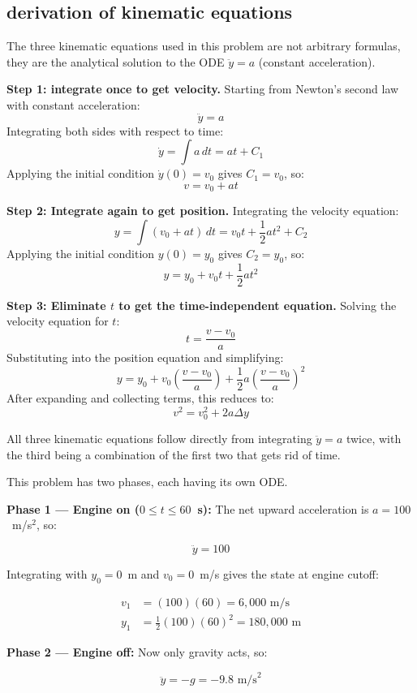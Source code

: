 \documentclass[12pt]{article}
\begin{document}
\subsection{derivation of kinematic equations}

The three kinematic equations used in this problem are not arbitrary formulas,
they are the analytical solution to the ODE $\ddot{y} = a$ (constant acceleration).

\textbf{Step 1: integrate once to get velocity.}
Starting from Newton's second law with constant acceleration:
\[
    \ddot{y} = a
\]
Integrating both sides with respect to time:
\[
    \dot{y} = \int a \, dt = at + C_1
\]
Applying the initial condition $\dot{y}(0) = v_0$ gives $C_1 = v_0$, so:
\[
    v = v_0 + at
\]

\textbf{Step 2: Integrate again to get position.}
Integrating the velocity equation:
\[
    y = \int (v_0 + at) \, dt = v_0 t + \frac{1}{2}at^2 + C_2
\]
Applying the initial condition $y(0) = y_0$ gives $C_2 = y_0$, so:
\[
    y = y_0 + v_0 t + \frac{1}{2}at^2
\]

\textbf{Step 3: Eliminate $t$ to get the time-independent equation.}
Solving the velocity equation for $t$:
\[
    t = \frac{v - v_0}{a}
\]
Substituting into the position equation and simplifying:
\[
    y = y_0 + v_0\left(\frac{v - v_0}{a}\right)
        + \frac{1}{2}a\left(\frac{v - v_0}{a}\right)^2
\]
After expanding and collecting terms, this reduces to:
\[
    v^2 = v_0^2 + 2a\Delta y
\]

All three kinematic equations follow directly from integrating $\ddot{y} = a$ twice,
with the third being a combination of the first two that gets rid of time.

This problem has two phases, each having its own ODE.

\textbf{Phase 1 --- Engine on ($0 \leq t \leq 60$~s):} The net upward acceleration is
$a = 100$~m/s$^2$, so:

\[
    \ddot{y} = 100
\]

Integrating with $y_0 = 0$~m and $v_0 = 0$~m/s gives the state at engine cutoff:

\begin{align*}
    v_1 &= (100)(60) = 6{,}000 \text{ m/s} \\
    y_1 &= \frac{1}{2}(100)(60)^2 = 180{,}000 \text{ m}
\end{align*}

\textbf{Phase 2 --- Engine off:} Now only gravity acts, so:

\[
    \ddot{y} = -g = -9.8 \text{ m/s}^2
\]
\end{document}
